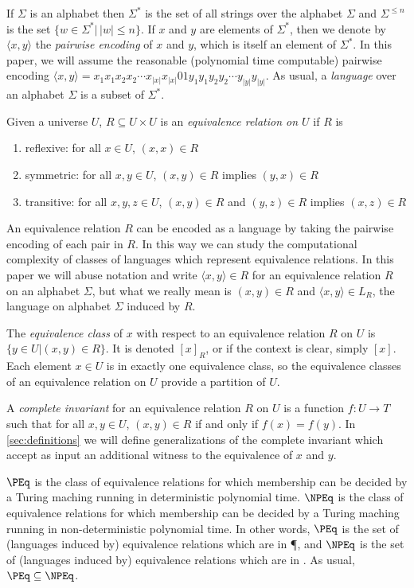 \documentclass[draft]{article}
\theoremstyle{definition} \newtheorem{openproblem}[openproblem]{Open problem}
\theoremstyle{definition} \newtheorem{definition}[definition]{Definition}
\theoremstyle{remark} \newtheorem{remark}{Remark}
\newcommand{\defn}[1]{\emph{#1}} %
\newcommand{\pair}[2]{\langle#1,#2\rangle} %
\begin{document}
If $\Sigma$ is an alphabet then $\Sigma^*$ is the set of all strings over the alphabet $\Sigma$ and $\Sigma^{\leq n}$ is the set $\{w\in\Sigma^*|\,|w|\leq n\}$.
If $x$ and $y$ are elements of $\Sigma^*$, then we denote by $\pair{x}{y}$ the \defn{pairwise encoding} of $x$ and $y$, which is itself an element of $\Sigma^*$.
In this paper, we will assume the reasonable (polynomial time computable) pairwise encoding $\pair{x}{y}=x_1x_1x_2x_2\cdots x_{|x|}x_{|x|}01y_1y_1y_2y_2\cdots y_{|y|}y_{|y|}$.
As usual, a \defn{language} over an alphabet $\Sigma$ is a subset of $\Sigma^*$.

Given a universe $U$, $R\subseteq U\times U$ is an \defn{equivalence relation on $U$} if $R$ is
\begin{enumerate}
\item reflexive: for all $x\in U$, $(x,x)\in R$
\item symmetric: for all $x,y\in U$, $(x,y)\in R$ implies $(y,x)\in R$
\item transitive: for all $x,y,z\in U$, $(x,y)\in R$ and $(y,z)\in R$ implies $(x,z)\in R$
\end{enumerate}
An equivalence relation $R$ can be encoded as a language by taking the pairwise encoding of each pair in $R$.
In this way we can study the computational complexity of classes of languages which represent equivalence relations.
In this paper we will abuse notation and write $\pair{x}{y}\in R$ for an equivalence relation $R$ on an alphabet $\Sigma$, but what we really mean is $(x,y)\in R$ and $\pair{x}{y}\in L_R$, the language on alphabet $\Sigma$ induced by $R$.

The \defn{equivalence class} of $x$ with respect to an equivalence relation $R$ on $U$ is $\{y\in U|(x,y)\in R\}$. It is denoted $[x]_R$, or if the context is clear, simply $[x]$.
Each element $x\in U$ is in exactly one equivalence class, so the equivalence classes of an equivalence relation on $U$ provide a partition of $U$.

A \defn{complete invariant} for an equivalence relation $R$ on $U$ is a function $f\colon U\to T$ such that for all $x,y\in U$, $(x,y)\in R$ if and only if $f(x)=f(y)$.
In \autoref{sec:definitions} we will define generalizations of the complete invariant which accept as input an additional witness to the equivalence of $x$ and $y$.

\defn{$\PEq$} is the class of equivalence relations for which membership can be decided by a Turing maching running in deterministic polynomial time.
\defn{$\NPEq$} is the class of equivalence relations for which membership can be decided by a Turing maching running in non-deterministic polynomial time.
In other words, $\PEq$ is the set of (languages induced by) equivalence relations which are in \P, and $\NPEq$ is the set of (languages induced by) equivalence relations which are in \NP.
As usual, $\PEq\subseteq\NPEq$.
\end{document}

